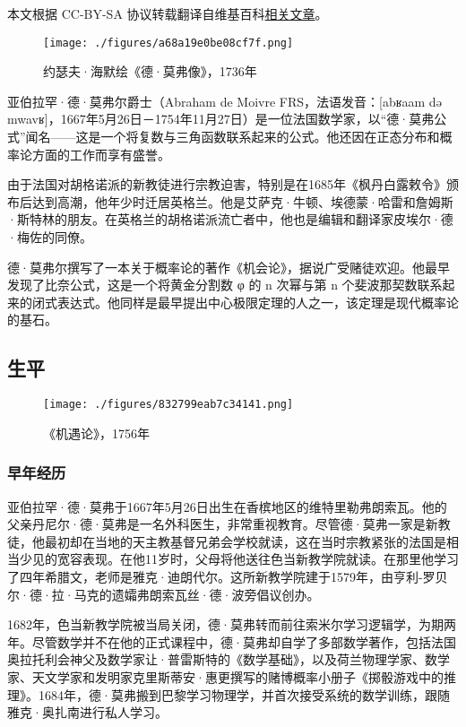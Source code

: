 
本文根据 CC-BY-SA 协议转载翻译自维基百科\href{https://en.wikipedia.org/wiki/Abraham_de_Moivre}{相关文章}。

\begin{figure}[ht]
\centering
\texttt{[image: ./figures/a68a19e0be08cf7f.png]}
\caption{约瑟夫·海默绘《德·莫弗像》，1736年} \label{fig_YBLH_1}
\end{figure}
亚伯拉罕·德·莫弗尔爵士（Abraham de Moivre FRS，法语发音：[abʁaam də mwavʁ]，1667年5月26日－1754年11月27日）是一位法国数学家，以“德·莫弗公式”闻名——这是一个将复数与三角函数联系起来的公式。他还因在正态分布和概率论方面的工作而享有盛誉。

由于法国对胡格诺派的新教徒进行宗教迫害，特别是在1685年《枫丹白露敕令》颁布后达到高潮，他年少时迁居英格兰。他是艾萨克·牛顿、埃德蒙·哈雷和詹姆斯·斯特林的朋友。在英格兰的胡格诺派流亡者中，他也是编辑和翻译家皮埃尔·德·梅佐的同僚。

德·莫弗尔撰写了一本关于概率论的著作《机会论》，据说广受赌徒欢迎。他最早发现了比奈公式，这是一个将黄金分割数 φ 的 n 次幂与第 n 个斐波那契数联系起来的闭式表达式。他同样是最早提出中心极限定理的人之一，该定理是现代概率论的基石。
\subsection{生平}
\begin{figure}[ht]
\centering
\texttt{[image: ./figures/832799eab7c34141.png]}
\caption{《机遇论》，1756年} \label{fig_YBLH_2}
\end{figure}
\subsubsection{早年经历}
亚伯拉罕·德·莫弗于1667年5月26日出生在香槟地区的维特里勒弗朗索瓦。他的父亲丹尼尔·德·莫弗是一名外科医生，非常重视教育。尽管德·莫弗一家是新教徒，他最初却在当地的天主教基督兄弟会学校就读，这在当时宗教紧张的法国是相当少见的宽容表现。在他11岁时，父母将他送往色当新教学院就读。在那里他学习了四年希腊文，老师是雅克·迪朗代尔。这所新教学院建于1579年，由亨利-罗贝尔·德·拉·马克的遗孀弗朗索瓦丝·德·波旁倡议创办。

1682年，色当新教学院被当局关闭，德·莫弗转而前往索米尔学习逻辑学，为期两年。尽管数学并不在他的正式课程中，德·莫弗却自学了多部数学著作，包括法国奥拉托利会神父及数学家让·普雷斯特的《数学基础》，以及荷兰物理学家、数学家、天文学家和发明家克里斯蒂安·惠更撰写的赌博概率小册子《掷骰游戏中的推理》。1684年，德·莫弗搬到巴黎学习物理学，并首次接受系统的数学训练，跟随雅克·奥扎南进行私人学习。


